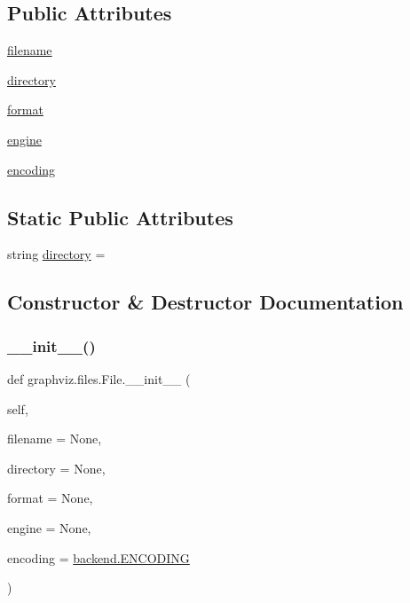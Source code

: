 \subsection*{Public Attributes}
\begin{DoxyCompactItemize}
\item 
\hyperlink{classgraphviz_1_1files_1_1File_ad8357bf1553bf74f1d05954c0a0986a8}{filename}
\item 
\hyperlink{classgraphviz_1_1files_1_1File_a75e175ae400b365a01bf1e37f4c4ff72}{directory}
\item 
\hyperlink{classgraphviz_1_1files_1_1File_acd2dce8967c8ff4c00ad6c47872dc340}{format}
\item 
\hyperlink{classgraphviz_1_1files_1_1File_aabc771621d8e81fccc4003231716e9cf}{engine}
\item 
\hyperlink{classgraphviz_1_1files_1_1File_aec4aaf697774bce61c327584985eb42b}{encoding}
\end{DoxyCompactItemize}
\subsection*{Static Public Attributes}
\begin{DoxyCompactItemize}
\item 
string \hyperlink{classgraphviz_1_1files_1_1File_a17fd3abb3628eca94effe35cf1237a73}{directory} = \textquotesingle{}\textquotesingle{}
\end{DoxyCompactItemize}


\subsection{Constructor \& Destructor Documentation}
\mbox{\label{classgraphviz_1_1files_1_1File_a84665997ab9877bbfe2fb7cb85f38425}} 
\subsubsection{\texorpdfstring{\+\_\+\+\_\+init\+\_\+\+\_\+()}{\_\_init\_\_()}}
{\footnotesize\ttfamily def graphviz.\+files.\+File.\+\_\+\+\_\+init\+\_\+\+\_\+ (\begin{DoxyParamCaption}\item[{}]{self,  }\item[{}]{filename = {\ttfamily None},  }\item[{}]{directory = {\ttfamily None},  }\item[{}]{format = {\ttfamily None},  }\item[{}]{engine = {\ttfamily None},  }\item[{}]{encoding = {\ttfamily \hyperlink{namespacegraphviz_1_1backend_aaa5c3555a484c96a0b0e5356ce3a577d}{backend.\+E\+N\+C\+O\+D\+I\+NG}} }\end{DoxyParamCaption})}



